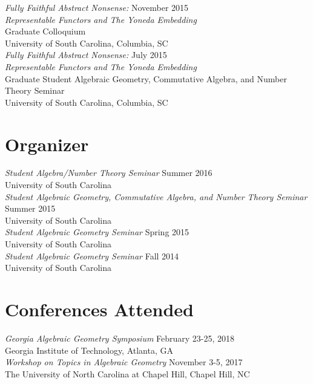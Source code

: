 \documentclass{article}
\begin{document}
  \noindent\textsl{Fully Faithful Abstract Nonsense:} \hfill November 2015\\
  \textsl{Representable Functors and The Yoneda Embedding}\\
  Graduate Colloquium\\
  University of South Carolina, Columbia, SC\\

  \noindent\textsl{Fully Faithful Abstract Nonsense:} \hfill July 2015\\
  \textsl{Representable Functors and The Yoneda Embedding}\\
  Graduate Student Algebraic Geometry, Commutative Algebra, and Number Theory Seminar\\
  University of South Carolina, Columbia, SC

  \newpage
  \section*{Organizer}
  \textsl{Student Algebra/Number Theory Seminar} \hfill Summer 2016\\
  University of South Carolina\\
  
  \noindent\textsl{Student Algebraic Geometry, Commutative Algebra, and Number Theory Seminar} \hfill Summer 2015\\
  University of South Carolina\\
  
  \noindent\textsl{Student Algebraic Geometry Seminar} \hfill Spring 2015\\
  University of South Carolina\\

  \noindent\textsl{Student Algebraic Geometry Seminar} \hfill Fall 2014\\
  University of South Carolina
  
  \section*{Conferences Attended}
  \textsl{Georgia Algebraic Geometry Symposium} \hfill February 23-25, 2018\\
  Georgia Institute of Technology, Atlanta, GA\\
  
  \noindent\textsl{Workshop on Topics in Algebraic Geometry} \hfill November 3-5, 2017\\
  The University of North Carolina at Chapel Hill, Chapel Hill, NC\\
  
\end{document}
